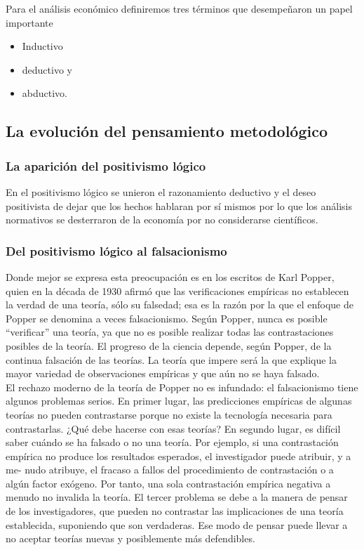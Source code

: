\documentclass[10pt]{book}
\begin{document}
Para el análisis económico definiremos tres términos que desempeñaron un papel importante 

\begin{itemize}
    \item Inductivo
    \item deductivo y
    \item abductivo.
\end{itemize}


\subsection{La evolución del pensamiento metodológico}
\subsubsection{La aparición del positivismo lógico}
En el positivismo lógico se unieron el razonamiento deductivo y el deseo positivista de dejar que los hechos hablaran por sí mismos por lo que los análisis normativos se desterraron de la economía por no considerarse científicos.

\subsubsection{Del positivismo lógico al falsacionismo}
Donde mejor se expresa esta preocupación es en los escritos de Karl Popper, quien en la década de 1930 afirmó que las verificaciones empíricas no establecen la verdad de una teoría, sólo su falsedad; esa es la razón por la que el enfoque de Popper se denomina a veces falsacionismo. Según Popper, nunca es posible “verificar” una teoría, ya que no es posible realizar todas las contrastaciones posibles de la teoría. El progreso de la ciencia depende, según Popper, de la continua falsación de las teorías. La teoría que impere será la que explique la mayor variedad de observaciones empíricas y que aún no se haya falsado.\\

El rechazo moderno de la teoría de Popper no es infundado: el falsacionismo tiene algunos problemas serios. En primer lugar, las predicciones empíricas de algunas teorías no pueden contrastarse porque no existe la tecnología necesaria para contrastarlas. ¿Qué debe hacerse con esas teorías? En segundo lugar, es difícil saber cuándo se ha falsado o no una teoría. Por ejemplo, si una contrastación empírica no produce los resultados esperados, el investigador puede atribuir, y a me- nudo atribuye, el fracaso a fallos del procedimiento de contrastación o a algún factor exógeno. Por tanto, una sola contrastación empírica negativa a menudo no invalida la teoría. El tercer problema se debe a la manera de pensar de los investigadores, que pueden no contrastar las implicaciones de una teoría establecida, suponiendo que son verdaderas. Ese modo de pensar puede llevar a no aceptar teorías nuevas y posiblemente más defendibles.
\end{document}
